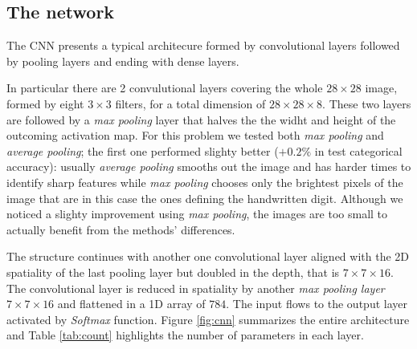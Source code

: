 \documentclass[compsoc]{IEEEtran}
\begin{document}
\subsection{The network}
The CNN presents a typical architecure formed by convolutional layers followed by pooling layers and ending with dense layers. \par
In particular there are 2 convulutional layers covering the whole $28 \times 28$ image, formed by eight $3 \times 3$ filters, for a total dimension of $28 \times 28 \times 8$. These two layers are followed by a \emph{max pooling} layer that halves the the widht and height of the outcoming activation map. For this problem we tested both \emph{max pooling} and \emph{average pooling}; the first one performed slighty better ($+0.2\%$ in test categorical accuracy): usually \emph{average pooling} smooths out the image and has harder times to identify sharp features while \emph{max pooling} chooses only the brightest pixels of the image that are in this case the ones defining the handwritten digit. Although we noticed a slighty improvement using \emph{max pooling}, the images are too small to actually benefit from the methods' differences. \par
The structure continues with another one convolutional layer aligned with the 2D spatiality of the last pooling layer but doubled in the depth, that is $7 \times 7 \times 16$. The convolutional layer is reduced in spatiality by another \emph{max pooling layer} $7 \times 7 \times 16$ and flattened in a 1D array of $784$. The input flows to the output layer activated by \emph{Softmax} function. Figure \ref{fig:cnn} summarizes the entire architecture and Table \ref{tab:count} highlights the number of parameters in each layer.
\end{document}
